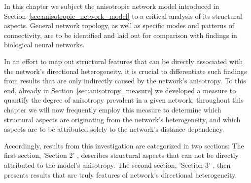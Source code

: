 In this chapter we subject the anisotropic network
model introduced in Section~\ref{sec:anisotropic_network_model} to a
critical analysis of its structural aspects. General network topology,
as well as specific modes and patterns of connectivity, are to be
identified and laid out for comparison with findings in biological
neural networks.

In an effort to map out structural features that can be directly
associated with the network's directional  heterogeneity, it is crucial to differentiate
such findings from results that are only indirectly caused by the
network's anisotropy. To this end, already in
Section~\ref{sec:anisotropy_measure} we developed a measure to
quantify the degree of anisotropy prevalent in a given network;
throughout this chapter we will now frequently employ this measure to
determine which structural aspects are originating from the network's
heterogeneity, and which aspects are to be attributed solely to the
network's distance dependency.

Accordingly, results from this investigation are categorized in two
sections: The first section, 'Section 2' %
, describes structural aspects that can not be directly attributed to
the model's anisotropy. The second section, 'Section 3' %
, then presents results that are truly features of network's
directional heterogeneity.







